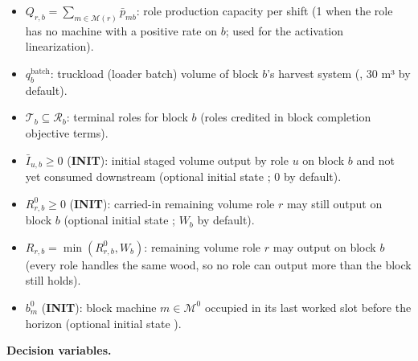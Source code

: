 \begin{itemize}
  role needs more than \(\beta_{r,b}\) shifts to stage it.
\item
  \(Q_{r,b}=\sum_{m\in\mathcal{M}(r)}\bar{p}_{mb}\): role production
  capacity per shift (1 when the role has no machine with a positive
  rate on \(b\); used for the activation linearization).
\item
  \(q^{\text{batch}}_{b}\): truckload (loader batch) volume of block
  \(b\)'s harvest system (, 30 m³ by
  default).
\item
  \(\mathcal{T}_b \subseteq \mathcal{R}_b\): terminal roles for block
  \(b\) (roles credited in block completion objective terms).
\item
  \(\bar{I}_{u,b} \ge 0\) (\textbf{INIT}): initial staged volume output
  by role \(u\) on block \(b\) and not yet consumed downstream (optional
  initial state ; 0 by default).
\item
  \(R^{0}_{r,b} \ge 0\) (\textbf{INIT}): carried-in remaining volume
  role \(r\) may still output on block \(b\) (optional initial state
  ; \(W_b\) by default).
\item
  \(R_{r,b} = \min(R^{0}_{r,b}, W_b)\): remaining volume role \(r\) may
  output on block \(b\) (every role handles the same wood, so no role
  can output more than the block still holds).
\item
  \(b^{0}_m\) (\textbf{INIT}): block machine \(m\in\mathcal{M}^{0}\)
  occupied in its last worked slot before the horizon (optional initial
  state ).
\end{itemize}

\textbf{Decision variables.}

